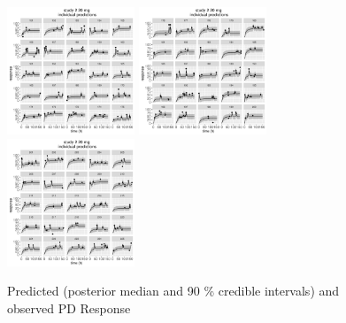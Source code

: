 \documentclass[11pt]{amsart}
\begin{document}
\begin{figure}[htbp]
\includegraphics[width=1.5in,trim=0in 0in 0 0in]{graphics/effCptModelTorsten/effCptModelTorstenPlots024.pdf}
\includegraphics[width=1.5in,trim=0in 0in 0 0in]{graphics/effCptModelTorsten/effCptModelTorstenPlots025.pdf}
\includegraphics[width=1.5in,trim=0in 0in 0 0in]{graphics/effCptModelTorsten/effCptModelTorstenPlots026.pdf}
\caption{{Predicted (posterior median and 90 \% credible intervals) and observed PD Response}}
\label{predictions}
\end{figure}
\end{document}
